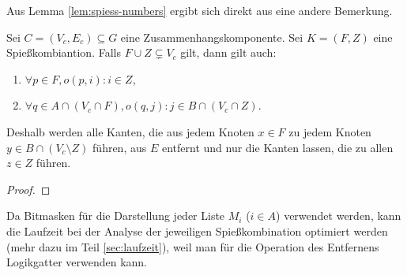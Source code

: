 Aus Lemma \ref{lem:spiess-numbers} ergibt sich direkt aus eine andere Bemerkung.

\begin{lemma}\label{lem:komponente-mengen}
Sei $C = (V_c, E_c) \subseteq G$ eine Zusammenhangskomponente.
Sei $K = (F, Z)$ eine Spießkombiantion.
Falls $F \cup Z \subsetneq V_c$ gilt, dann gilt auch:
\begin{enumerate}[label={\upshape(\roman*)}]
  \item $\forall p \in F, o(p, i): i \in Z$,
  \item $\forall q \in A \cap (V_c \cap F), o(q, j): j \in B \cap (V_c \cap Z)$.
\end{enumerate}
Deshalb werden alle Kanten, die aus jedem Knoten $x \in F$ 
zu jedem Knoten $y \in B \cap (V_c \setminus Z)$ führen, aus $E$ entfernt und nur die Kanten lassen, die
zu allen $z \in Z$ führen.
\end{lemma}

\begin{proof}
\end{proof}

 
Da Bitmasken für die Darstellung jeder Liste $M_i$ ($i \in A$) verwendet werden, kann
die Laufzeit bei der Analyse der jeweiligen Spießkombination optimiert werden
(mehr dazu im Teil \ref{sec:laufzeit}),
weil man für die Operation des Entfernens Logikgatter verwenden kann.

